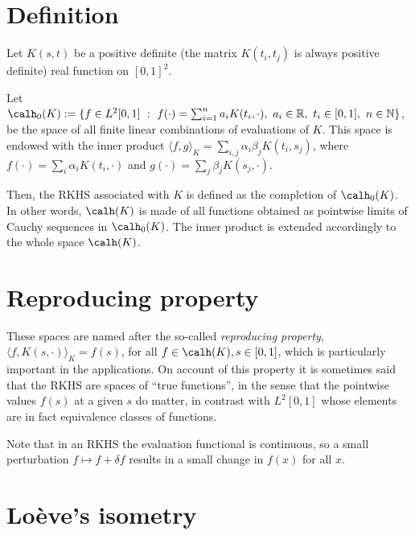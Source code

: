 \section*{Definition}

	Let $K(s,t)$ be a positive definite (the matrix $K(t_i,t_j)$ is always positive definite) real function on $[0,1]^2$.

	Let $\calh_0(K):=\{f\in L^2[0,1] \ : \ f(\cdot)=\sum_{i=1}^n a_i K(t_i,\cdot),\ a_i\in{\mathbb R},\ t_i\in[0,1],\ n\in{\mathbb N}\}$, be
	the space of all finite linear combinations of evaluations of $K$.  This space is endowed with the inner product
	$\langle f,g\rangle_K=\sum_{i,j}\alpha_i\beta_j K(t_i,s_j)$,
	where $f(\cdot)=\sum_i\alpha_i K(t_i,\cdot)$ and $g(\cdot)=\sum_j\beta_j K(s_j,\cdot)$.

	Then, the RKHS associated with $K$ is defined as the completion of $\calh_0(K)$. In other words, $\calh(K)$ is made of all functions obtained as pointwise limits of Cauchy sequences in $\calh_0(K)$. The inner product is extended accordingly to the whole space $\calh(K)$.

\section*{Reproducing property}

	These spaces are named after the so-called \textit{reproducing property},
	$\langle f, K(s,\cdot)\rangle_K = f(s)$, for all  $f\in\calh(K), s\in[0,1]$, which is particularly important in the applications. On account of this property it is sometimes said that the RKHS are spaces of ``true functions'', in the sense that the pointwise values $f(s)$ at a given $s$ do matter, in contrast with $L^2[0,1]$ whose elements are in fact equivalence classes of functions.

  Note that in an RKHS the evaluation functional is continuous, so a small perturbation $f\mapsto f + \delta f$ results in a small change in $f(x)$ for all $x$.


\section*{Loève's isometry}

